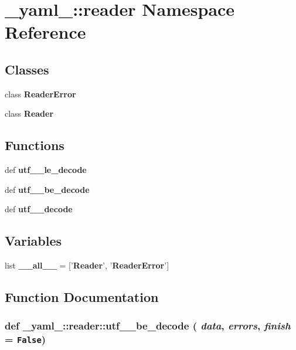 \section{\_\-yaml\_\-::reader Namespace Reference}
\label{namespace__yaml___1_1reader}


\subsection*{Classes}
\begin{CompactItemize}
\item 
class {\bf ReaderError}
\item 
class {\bf Reader}
\end{CompactItemize}
\subsection*{Functions}
\begin{CompactItemize}
\item 
def {\bf utf\_\_\-le\_\-decode}
\item 
def {\bf utf\_\_\-be\_\-decode}
\item 
def {\bf utf\_\_\-decode}
\end{CompactItemize}
\subsection*{Variables}
\begin{CompactItemize}
\item 
list {\bf \_\-\_\-all\_\-\_\-} = ['{\bf Reader}', '{\bf ReaderError}']
\end{CompactItemize}


\subsection{Function Documentation}
\subsubsection{\setlength{\rightskip}{0pt plus 5cm}def \_\-yaml\_\-::reader::utf\_\_\-be\_\-decode ( {\em data},  {\em errors},  {\em finish} = {\tt False})}\label{namespace__yaml___1_1reader_57ce63dd7241871311b98092e548e8b4}




